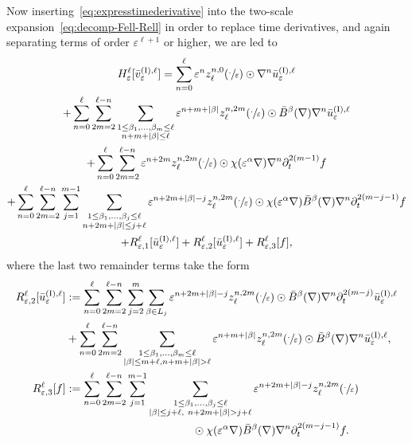 \documentclass[JEP,XML,SOM,Unicode,published]{cedram}
\theoremstyle{plain}
\theoremstyle{definition}
\numberwithin{equation}{section}
\newcommand{\e}{\varepsilon}
\begin{document}
Now inserting~\eqref{eq:expresstimederivative} into the two-scale expansion~\eqref{eq:decomp-Fell-Rell} in order to replace time derivatives, and again {separating} terms of order $\e^{\ell+1}$ or higher, we are led to
\begin{multline}\label{eq:Fell-decomp-final-ploplop}
H^\ell_\e[\bar v_\e^{\text{(I)},\ell}]
=
\sum_{n=0}^\ell\e^{n}z^{n,0}_\ell(\sfrac{\cdot}{\e})\odot\nabla^n\bar{u}^{\text{(I)},\ell}_{\e}\\
+\sum_{n=0}^\ell\sum_{2m=2}^{\ell-n}\sum_{\substack{1\le \beta_1,\ldots,\beta_{m}\le \ell\\ n+m+|\beta|\le\ell}}\e^{n+m+|\beta|}z^{n,2m}_\ell(\sfrac{\cdot}{\e})\odot \bar B^\beta(\nabla)\nabla^n\bar{u}^{\text{(I)},\ell}_{\e}\\
+\sum_{n=0}^\ell\sum_{2m=2}^{\ell-n}\e^{n+2m}z^{n,2m}_\ell(\sfrac{\cdot}{\e})\odot\chi(\e^{\alpha}\nabla)\nabla^n\partial_t^{2(m-1)}f\\
+\sum_{n=0}^\ell\sum_{2m=2}^{\ell-n}\sum_{j=1}^{m-1}\sum_{\substack{1\le \beta_1,\ldots,\beta_j\le\ell\\ n+2m+|\beta|\le j+\ell}}\e^{n+2m+|\beta|-j}z^{n,2m}_\ell(\sfrac{\cdot}{\e})\odot\chi(\e^{\alpha}\nabla)\bar B^\beta(\nabla)\nabla^n\partial_t^{2(m-j-1)}f\\
+R^{\ell}_{\e,1}[\bar u_{\e}^{\text{(I)},\ell}]+R^{\ell}_{\e,2}[\bar u_{\e}^{\text{(I)},\ell}]+R^{\ell}_{\e,3}[f],
\end{multline}
where the last two remainder terms take the form
\begin{align*}
R^{\ell}_{\e,2}[\bar u_{\e}^{\text{(I)},\ell}]&:= \sum_{n=0}^\ell\sum_{2m=2}^{\ell-n}\sum_{j=2}^m\sum_{\beta\in L_j}\e^{n+2m+|\beta|-j}z_\ell^{n,2m}(\sfrac{\cdot}{\e})\odot\bar B^\beta(\nabla)\nabla^n\partial_t^{2(m-j)}\bar u^{\text{(I)},\ell}_\e\\
&+\sum_{n=0}^\ell\sum_{2m=2}^{\ell-n}\sum_{\substack{1\le \beta_1,\ldots,\beta_{m}\le \ell\\|\beta|\le m+\ell,n+m+|\beta|>\ell}}\e^{n+m+|\beta|}z_\ell^{n,2m}(\sfrac{\cdot}{\e})\odot\bar B^\beta(\nabla)\nabla^n\bar{u}^{\text{(I)},\ell}_{\e},\\
R^{\ell}_{\e,3}[f]&:= \sum_{n=0}^\ell\sum_{2m=2}^{\ell-n}\sum_{j=1}^{m-1}\sum_{\substack{1\le \beta_1,\ldots,\beta_j\le\ell\\ |\beta|\le j+\ell,~n+2m+|\beta|>j+\ell}}\e^{n+2m+|\beta|-j} z_\ell^{n,2m}(\sfrac{\cdot}{\e})\\
&\hspace{4cm}\odot\chi(\e^{\alpha}\nabla)\bar B^\beta(\nabla)\nabla^n\partial_t^{2(m-j-1)}f.
\end{align*}
\end{document}
